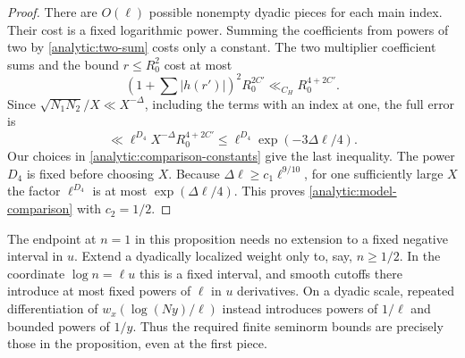 \begin{proof}
There are $O(\ell)$ possible nonempty dyadic pieces for each main
index. Their cost is a fixed logarithmic power. Summing the
coefficients from powers of two by \eqref{analytic:two-sum} costs
only a constant. The two multiplier coefficient sums and the
bound $r\leq R_0^2$ cost at most
\[
 (1+\textstyle\sum|h(r')|)^2R_0^{2C'}\ll_{C_H}R_0^{4+2C'}.
\]
Since $\sqrt{N_1N_2}/X\ll X^{-\Delta}$, including the terms with an
index at one, the full error is
\begin{equation}\label{analytic:total-comparison-error}
 \ll\ell^{D_4}X^{-\Delta}R_0^{4+2C'}
 \leq\ell^{D_4}\exp(-3\Delta\ell/4).
\end{equation}
Our choices in \eqref{analytic:comparison-constants} give the last
inequality. The power $D_4$ is fixed before choosing $X$.
Because $\Delta\ell\geq c_1\ell^{9/10}$, for one sufficiently large
$X$ the factor $\ell^{D_4}$ is at most
$\exp(\Delta\ell/4)$. This proves
\eqref{analytic:model-comparison} with $c_2=1/2$.
\end{proof}

The endpoint at $n=1$ in this proposition needs no extension to a fixed
negative interval in $u$.
Extend a dyadically localized weight only to, say, $n\geq1/2$.
In the coordinate $\log n=\ell u$ this is a fixed interval, and
smooth cutoffs there introduce at most fixed powers of $\ell$ in
$u$ derivatives. On a dyadic scale, repeated differentiation of
$w_x(\log(Ny)/\ell)$ instead introduces powers of $1/\ell$ and
bounded powers of $1/y$. Thus the required finite seminorm bounds
are precisely those in the proposition, even at the first piece.
